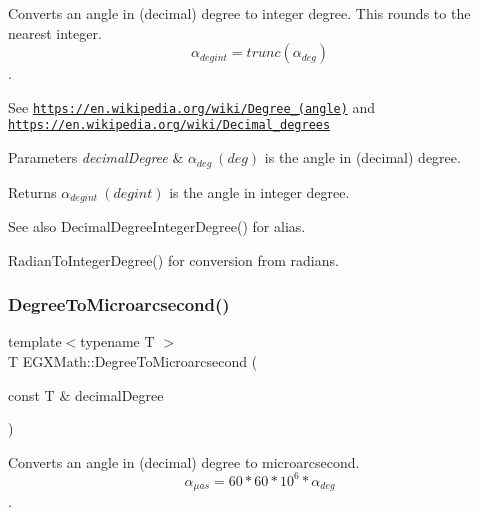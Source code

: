 Converts an angle in (decimal) degree to integer degree. This rounds to the nearest integer. \[\alpha_{deg int}=trunc(\alpha_{deg})\]. 

See \href{https://en.wikipedia.org/wiki/Degree_(angle)}{\tt https\+://en.\+wikipedia.\+org/wiki/\+Degree\+\_\+(angle)} and \href{https://en.wikipedia.org/wiki/Decimal_degrees}{\tt https\+://en.\+wikipedia.\+org/wiki/\+Decimal\+\_\+degrees} 
\begin{DoxyParams}{Parameters}
{\em decimal\+Degree} & $\alpha_{deg}\ (deg)$ is the angle in (decimal) degree. \\
\hline
\end{DoxyParams}
\begin{DoxyReturn}{Returns}
$\alpha_{deg int}\ (deg int)$ is the angle in integer degree. 
\end{DoxyReturn}
\begin{DoxySeeAlso}{See also}
Decimal\+Degree\+Integer\+Degree() for alias. 

Radian\+To\+Integer\+Degree() for conversion from radians. 
\end{DoxySeeAlso}
\mbox{\label{group___e_g_x_math-_angle_conversions-_degree_ga31b65388fe1b4656663b3d66b9d764e6}} 
\subsubsection{\texorpdfstring{Degree\+To\+Microarcsecond()}{DegreeToMicroarcsecond()}}
{\footnotesize\ttfamily template$<$typename T $>$ \\
T E\+G\+X\+Math\+::\+Degree\+To\+Microarcsecond (\begin{DoxyParamCaption}\item[{const T \&}]{decimal\+Degree }\end{DoxyParamCaption})}



Converts an angle in (decimal) degree to microarcsecond. \[\alpha_{\mu as}=60 * 60 * 10^6 * \alpha_{deg}\]. 

